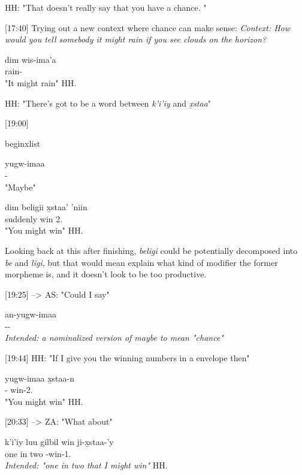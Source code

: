 HH: "That doesn't really say that you have a chance. "

[17:40] Trying out a new context where chance can make sense: \textit{Context: How would you tell somebody it might rain if you see clouds on the horizon?}
\begin{exe}
\ex \gll 
dim wis-ima'a \\
\Fut{} rain-\Epis{} \\
\glt "It might rain" \hfill HH.\ElicitationDate{}
\end{exe} 

HH: "There's got to be a word between \textit{k'i'iy} and \textit{x̱staa}"

[19:00]
\begin{exe}
\ex begin{xlist}
\item \gll 
yugw-imaa \\
\Prog{}-\Epis{} \\
\glt "Maybe"
\item \gll
dim beligii x̱staa' 'niin \\
\Fut{} suddenly win 2.\Iii{} \\
\glt "You might win" \hfill HH.\ElicitationDate{}
\end{exe}

Looking back at this after finishing, \textit{beligi} could be potentially decomposed into \textit{be} and \textit{ligi}, but that would mean explain what kind of modifier the former morpheme is, and it doesn't look to be too productive.

[19:25] --> AS: "Could I say"
\begin{exe}
\ex \gll 
an-yugw-imaa \\
\Nmlz{}-\Prog{}-\Epis{}\\
\glt \textit{Intended: a nominalized version of maybe to mean "chance"}
\end{exe}

[19:44] HH: "If I give you the winning numbers in a envelope then"
\begin{exe}
\ex \gll 
yugw-imaa x̱staa-n\\
\Prog{}-\Epis{} win-2.\Ii{}\\
\glt "You might win" \hfill HH.\ElicitationDate{}
\end{exe}

[20:33] --> ZA: "What about"
\begin{exe}
\ex \gll
k'i'iy luu gilbil win ji-x̱staa-'y \\
one in two \Comp{} \Irr{}-win-1.\Ii{}\\
\glt \textit{Intended: "one in two that I might win"} \hfill HH.\ElicitationDate{}
\end{exe}

